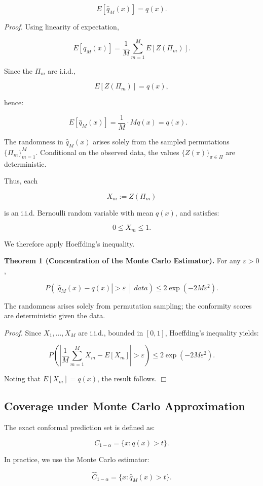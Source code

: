 \documentclass{article}
\begin{document}
\[
E[\hat{q}_M(x)] = q(x).
\]

\textit{Proof.}
Using linearity of expectation,

\[
E[\hat{q}_M(x)]
=
\frac{1}{M} \sum_{m=1}^M E[Z(\Pi_m)].
\]

Since the $\Pi_m$ are i.i.d.,

\[
E[Z(\Pi_m)] = q(x),
\]

hence:

\[
E[\hat{q}_M(x)]
=
\frac{1}{M} \cdot M q(x)
=
q(x).
\quad
\]


The randomness in $\hat{q}_M(x)$ arises solely from the sampled permutations $\{\Pi_m\}_{m=1}^M$. Conditional on the observed data, the values $\{Z(\pi)\}_{\pi \in \Pi}$ are deterministic.

Thus, each

\[
X_m := Z(\Pi_m)
\]

is an i.i.d. Bernoulli random variable with mean $q(x)$, and satisfies:

\[
0 \le X_m \le 1.
\]

We therefore apply Hoeffding’s inequality.

\textbf{Theorem 1 (Concentration of the Monte Carlo Estimator).}\label{Concentration}
For any $\varepsilon > 0$,

\[
P\left(
\left|
\hat{q}_M(x) - q(x)
\right|
>
\varepsilon
\,\middle|\,
data
\right)
\le
2\exp(-2M\varepsilon^2).
\]

The randomness arises solely from permutation sampling; the conformity scores are deterministic given the data.

\textit{Proof.}
Since $X_1,\ldots,X_M$ are i.i.d., bounded in $[0,1]$, Hoeffding’s inequality yields:

\[
P\left(
\left|
\frac{1}{M}\sum_{m=1}^M X_m - E[X_m]
\right|
>
\varepsilon
\right)
\le
2\exp(-2M\varepsilon^2).
\]

Noting that $E[X_m] = q(x)$, the result follows. \hfill $\Box$

\subsection{Coverage under Monte Carlo Approximation}

The exact conformal prediction set is defined as:

\[
C_{1-\alpha} = \{x : q(x) > t\}.
\]

In practice, we use the Monte Carlo estimator:

\[
\hat{C}_{1-\alpha} = \{x : \hat{q}_M(x) > t\}.
\]
\end{document}

